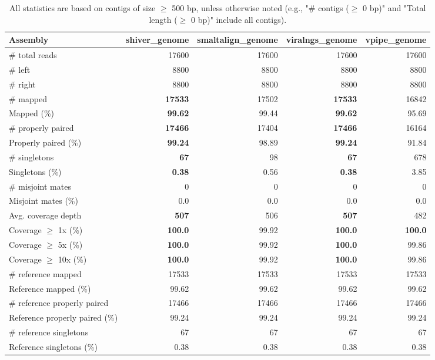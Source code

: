 \documentclass[12pt,a4paper]{article}
\begin{document}
\begin{table}[ht]
\begin{center}
\caption{All statistics are based on contigs of size $\geq$ 500 bp, unless otherwise noted (e.g., "\# contigs ($\geq$ 0 bp)" and "Total length ($\geq$ 0 bp)" include all contigs).}
\begin{tabular}{|l*{4}{|r}|}
\hline
Assembly & shiver\_genome & smaltalign\_genome & viralngs\_genome & vpipe\_genome \\ \hline
\# total reads & 17600 & 17600 & 17600 & 17600 \\ \hline
\# left & 8800 & 8800 & 8800 & 8800 \\ \hline
\# right & 8800 & 8800 & 8800 & 8800 \\ \hline
\# mapped & {\bf 17533} & 17502 & {\bf 17533} & 16842 \\ \hline
Mapped (\%) & {\bf 99.62} & 99.44 & {\bf 99.62} & 95.69 \\ \hline
\# properly paired & {\bf 17466} & 17404 & {\bf 17466} & 16164 \\ \hline
Properly paired (\%) & {\bf 99.24} & 98.89 & {\bf 99.24} & 91.84 \\ \hline
\# singletons & {\bf 67} & 98 & {\bf 67} & 678 \\ \hline
Singletons (\%) & {\bf 0.38} & 0.56 & {\bf 0.38} & 3.85 \\ \hline
\# misjoint mates & 0 & 0 & 0 & 0 \\ \hline
Misjoint mates (\%) & 0.0 & 0.0 & 0.0 & 0.0 \\ \hline
Avg. coverage depth & {\bf 507} & 506 & {\bf 507} & 482 \\ \hline
Coverage $\geq$ 1x (\%) & {\bf 100.0} & 99.92 & {\bf 100.0} & {\bf 100.0} \\ \hline
Coverage $\geq$ 5x (\%) & {\bf 100.0} & 99.92 & {\bf 100.0} & 99.86 \\ \hline
Coverage $\geq$ 10x (\%) & {\bf 100.0} & 99.92 & {\bf 100.0} & 99.86 \\ \hline
\# reference mapped & 17533 & 17533 & 17533 & 17533 \\ \hline
Reference mapped (\%) & 99.62 & 99.62 & 99.62 & 99.62 \\ \hline
\# reference properly paired & 17466 & 17466 & 17466 & 17466 \\ \hline
Reference properly paired (\%) & 99.24 & 99.24 & 99.24 & 99.24 \\ \hline
\# reference singletons & 67 & 67 & 67 & 67 \\ \hline
Reference singletons (\%) & 0.38 & 0.38 & 0.38 & 0.38 \\ \hline

\end{tabular}
\end{center}
\end{table}
\end{document}

